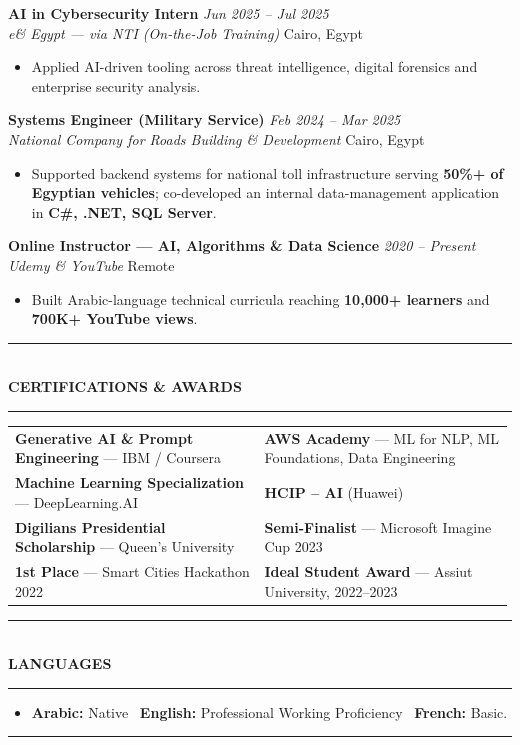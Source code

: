 \documentclass[10pt, a4paper]{article}
\makeatletter
\newcommand{\cvsection}[1]{%
  \vspace{3pt}%
  {\color{navy}\rule{\linewidth}{1.1pt}}\\[0.5pt]%
  {\color{navy}\bfseries\fontsize{9.5}{11}\selectfont\uppercase{#1}}\\[-4pt]%
  {\color{teal}\rule{\linewidth}{0.6pt}}%
  \vspace{2pt}%
}
\newcommand{\cventry}[4]{%
  \vspace{2.5pt}%
  \textbf{\color{darkgray}#1} \hfill {\color{midgray}\textit{#3}}\\[-1.5pt]%
  {\color{teal}\textit{#2}} \hfill {\color{midgray}#4}%
}
\newenvironment{cvitems}{%
  \begin{itemize}[leftmargin=11pt, itemsep=0.5pt, parsep=0pt, topsep=1pt,
                  label={\textcolor{teal}{$\bullet$}}]
}{%
  \end{itemize}%
}
\newenvironment{dualcol}{%
  \begin{tabular*}{\linewidth}{@{}p{0.495\linewidth}@{\hspace{0.01\linewidth}}p{0.495\linewidth}@{}}
}{%
  \end{tabular*}%
}
\makeatother
\begin{document}
\cventry{AI in Cybersecurity Intern}{e\& Egypt --- via NTI (On-the-Job Training)}
        {Jun 2025 -- Jul 2025}{Cairo, Egypt}
\begin{cvitems}
  \item Applied AI-driven tooling across threat intelligence, digital forensics and enterprise security analysis.
\end{cvitems}

\cventry{Systems Engineer (Military Service)}{National Company for Roads Building \& Development}
        {Feb 2024 -- Mar 2025}{Cairo, Egypt}
\begin{cvitems}
  \item Supported backend systems for national toll infrastructure serving \textbf{50\%+ of Egyptian vehicles}; co-developed an internal data-management application in \textbf{C\#, .NET, SQL Server}.
\end{cvitems}

\cventry{Online Instructor --- AI, Algorithms \& Data Science}{Udemy \& YouTube}
        {2020 -- Present}{Remote}
\begin{cvitems}
  \item Built Arabic-language technical curricula reaching \textbf{10,000+ learners} and \textbf{700K+ YouTube views}.
\end{cvitems}

\cvsection{Certifications \& Awards}

\begin{dualcol}
  \textbf{Generative AI \& Prompt Engineering} --- IBM / Coursera &
  \textbf{AWS Academy} --- ML for NLP, ML Foundations, Data Engineering \\[2pt]
  \textbf{Machine Learning Specialization} --- DeepLearning.AI &
  \textbf{HCIP -- AI} (Huawei) \\[2pt]
  \textbf{Digilians Presidential Scholarship} --- Queen's University &
  \textbf{Semi-Finalist} --- Microsoft Imagine Cup 2023 \\[2pt]
  \textbf{1st Place} --- Smart Cities Hackathon 2022 &
  \textbf{Ideal Student Award} --- Assiut University, 2022--2023 \\
\end{dualcol}

\cvsection{Languages}

\begin{cvitems}
  \item \textbf{Arabic:} Native \textperiodcentered\ \textbf{English:} Professional Working Proficiency \textperiodcentered\ \textbf{French:} Basic.
\end{cvitems}

\vspace{3pt}
{\color{navy}\rule{\linewidth}{0.8pt}}
\end{document}
